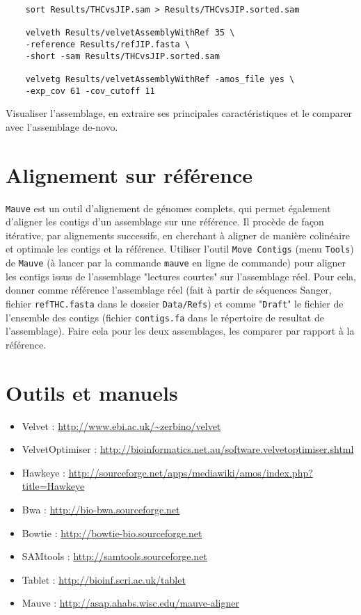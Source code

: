 \documentclass[a4paper,12pt]{article}
\begin{document}
\begin{lstlisting}
	sort Results/THCvsJIP.sam > Results/THCvsJIP.sorted.sam

	velveth Results/velvetAssemblyWithRef 35 \
	-reference Results/refJIP.fasta \
	-short -sam Results/THCvsJIP.sorted.sam
	
	velvetg Results/velvetAssemblyWithRef -amos_file yes \
	-exp_cov 61 -cov_cutoff 11
\end{lstlisting}

Visualiser l'assemblage, en extraire ses principales caractéristiques  et le comparer avec l'assemblage de-novo.

\section{Alignement sur référence}
\verb=Mauve= est un outil d'alignement de génomes complets, qui permet également d'aligner les contigs d'un assemblage sur une référence. Il procède de façon itérative, par alignements successifs, en cherchant à aligner de manière colinéaire et optimale les contigs et la référence.
Utiliser l'outil \verb=Move Contigs= (menu \verb=Tools=) de \verb=Mauve= (à lancer par la commande \verb=mauve= en ligne de commande) pour aligner les contigs issus de l'assemblage "lectures courtes" sur l'assemblage réel. Pour cela, donner comme référence l'assemblage réel (fait à partir de séquences Sanger, fichier \verb=refTHC.fasta= dans le dossier \verb=Data/Refs=) et comme "\verb=Draft=" le fichier de l'ensemble des contigs (fichier \verb=contigs.fa= dans le répertoire de resultat de l'assemblage). Faire cela pour les deux assemblages, les comparer par rapport à la référence. 

\section{Outils et manuels}

\begin{itemize}
	\item Velvet : \url{http://www.ebi.ac.uk/~zerbino/velvet}
	\item VelvetOptimiser : \url{http://bioinformatics.net.au/software.velvetoptimiser.shtml}
	\item Hawkeye : \url{http://sourceforge.net/apps/mediawiki/amos/index.php?title=Hawkeye}
	\item Bwa : \url{http://bio-bwa.sourceforge.net}
	\item Bowtie : \url{http://bowtie-bio.sourceforge.net}
	\item SAMtools : \url{http://samtools.sourceforge.net}
	\item Tablet : \url{http://bioinf.scri.ac.uk/tablet}
	\item Mauve : \url{http://asap.ahabs.wisc.edu/mauve-aligner}
	
\end{itemize}

{}

\end{document}
